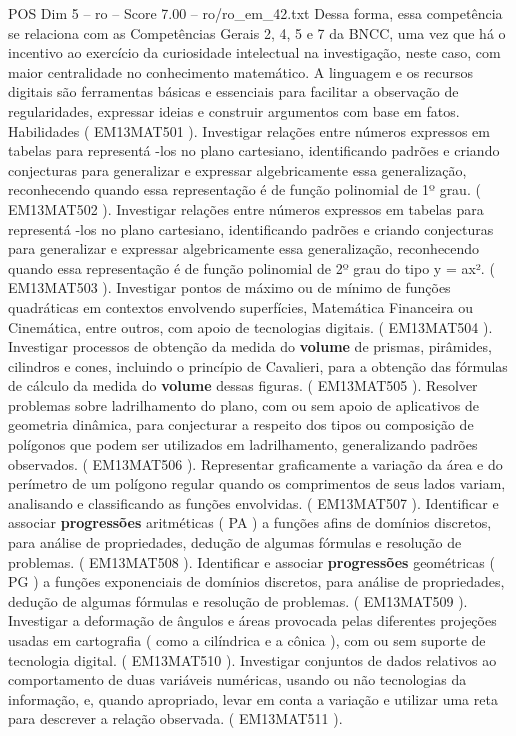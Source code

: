 \begin{textsample}{POS Dim 5 – ro – Score 7.00 – ro/ro\_em\_42.txt}
Dessa forma, essa competência se relaciona com as Competências Gerais 2, 4, 5 e 7 da BNCC, uma vez que há o incentivo ao exercício da curiosidade intelectual na investigação, neste caso, com maior centralidade no conhecimento matemático.
A linguagem e os recursos digitais são ferramentas básicas e essenciais para facilitar a observação de regularidades, expressar ideias e construir argumentos com base em fatos.
Habilidades ( EM13MAT501 ).
Investigar relações entre números expressos em tabelas para representá -los no plano cartesiano, identificando padrões e criando conjecturas para generalizar e expressar algebricamente essa generalização, reconhecendo quando essa representação é de função polinomial de 1º grau. ( EM13MAT502 ).
Investigar relações entre números expressos em tabelas para representá -los no plano cartesiano, identificando padrões e criando conjecturas para generalizar e expressar algebricamente essa generalização, reconhecendo quando essa representação é de função polinomial de 2º grau do tipo y = ax². ( EM13MAT503 ).
Investigar pontos de máximo ou de mínimo de funções quadráticas em contextos envolvendo superfícies, Matemática Financeira ou Cinemática, entre outros, com apoio de tecnologias digitais. ( EM13MAT504 ).
Investigar processos de obtenção da medida do \textbf{volume} de prismas, pirâmides, cilindros e cones, incluindo o princípio de Cavalieri, para a obtenção das fórmulas de cálculo da medida do \textbf{volume} dessas figuras. ( EM13MAT505 ).
Resolver problemas sobre ladrilhamento do plano, com ou sem apoio de aplicativos de geometria dinâmica, para conjecturar a respeito dos tipos ou composição de polígonos que podem ser utilizados em ladrilhamento, generalizando padrões observados. ( EM13MAT506 ).
Representar graficamente a variação da área e do perímetro de um polígono regular quando os comprimentos de seus lados variam, analisando e classificando as funções envolvidas. ( EM13MAT507 ).
Identificar e associar \textbf{progressões} aritméticas ( PA ) a funções afins de domínios discretos, para análise de propriedades, dedução de algumas fórmulas e resolução de problemas. ( EM13MAT508 ).
Identificar e associar \textbf{progressões} geométricas ( PG ) a funções exponenciais de domínios discretos, para análise de propriedades, dedução de algumas fórmulas e resolução de problemas. ( EM13MAT509 ).
Investigar a deformação de ângulos e áreas provocada pelas diferentes projeções usadas em cartografia ( como a cilíndrica e a cônica ), com ou sem suporte de tecnologia digital. ( EM13MAT510 ).
Investigar conjuntos de dados relativos ao comportamento de duas variáveis numéricas, usando ou não tecnologias da informação, e, quando apropriado, levar em conta a variação e utilizar uma reta para descrever a relação observada. ( EM13MAT511 ).

\end{textsample}
